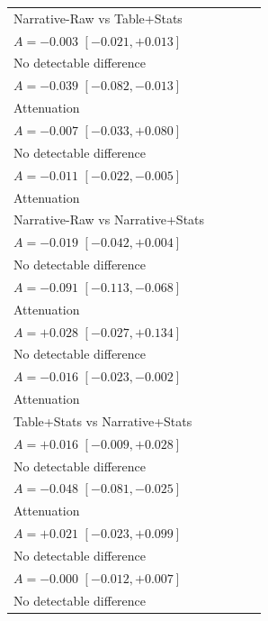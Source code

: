 \begin{table}[t]
\begin{tabular}{lp{3.35cm}p{3.35cm}p{3.35cm}p{3.35cm}}
Narrative-Raw vs Table+Stats & \shortstack{$S_{\mathrm{fixed}}=0.052,\; S_{\mathrm{LLM}}=0.048$\\$A=-0.003$ $[-0.021, +0.013]$\\No detectable difference} & \shortstack{$S_{\mathrm{fixed}}=0.064,\; S_{\mathrm{LLM}}=0.025$\\$A=-0.039$ $[-0.082, -0.013]$\\Attenuation} & \shortstack{$S_{\mathrm{fixed}}=0.023,\; S_{\mathrm{LLM}}=0.017$\\$A=-0.007$ $[-0.033, +0.080]$\\No detectable difference} & \shortstack{$S_{\mathrm{fixed}}=0.016,\; S_{\mathrm{LLM}}=0.005$\\$A=-0.011$ $[-0.022, -0.005]$\\Attenuation} \\
Narrative-Raw vs Narrative+Stats & \shortstack{$S_{\mathrm{fixed}}=0.037,\; S_{\mathrm{LLM}}=0.018$\\$A=-0.019$ $[-0.042, +0.004]$\\No detectable difference} & \shortstack{$S_{\mathrm{fixed}}=0.114,\; S_{\mathrm{LLM}}=0.023$\\$A=-0.091$ $[-0.113, -0.068]$\\Attenuation} & \shortstack{$S_{\mathrm{fixed}}=0.021,\; S_{\mathrm{LLM}}=0.048$\\$A=+0.028$ $[-0.027, +0.134]$\\No detectable difference} & \shortstack{$S_{\mathrm{fixed}}=0.016,\; S_{\mathrm{LLM}}=0.000$\\$A=-0.016$ $[-0.023, -0.002]$\\Attenuation} \\
Table+Stats vs Narrative+Stats & \shortstack{$S_{\mathrm{fixed}}=0.014,\; S_{\mathrm{LLM}}=0.030$\\$A=+0.016$ $[-0.009, +0.028]$\\No detectable difference} & \shortstack{$S_{\mathrm{fixed}}=0.050,\; S_{\mathrm{LLM}}=0.002$\\$A=-0.048$ $[-0.081, -0.025]$\\Attenuation} & \shortstack{$S_{\mathrm{fixed}}=0.011,\; S_{\mathrm{LLM}}=0.032$\\$A=+0.021$ $[-0.023, +0.099]$\\No detectable difference} & \shortstack{$S_{\mathrm{fixed}}=0.005,\; S_{\mathrm{LLM}}=0.005$\\$A=-0.000$ $[-0.012, +0.007]$\\No detectable difference} \\

\end{tabular}
\end{table}
